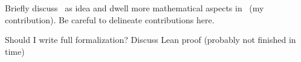 Briefly discuss~\cite{lohstroh_dac19} as idea and dwell more mathematical aspects in~\cite{Lohstroh_cyphy19} (my contribution). Be careful to delineate contributions here.

Should I write full formalization? Discuss Lean proof (probably not finished in time)

